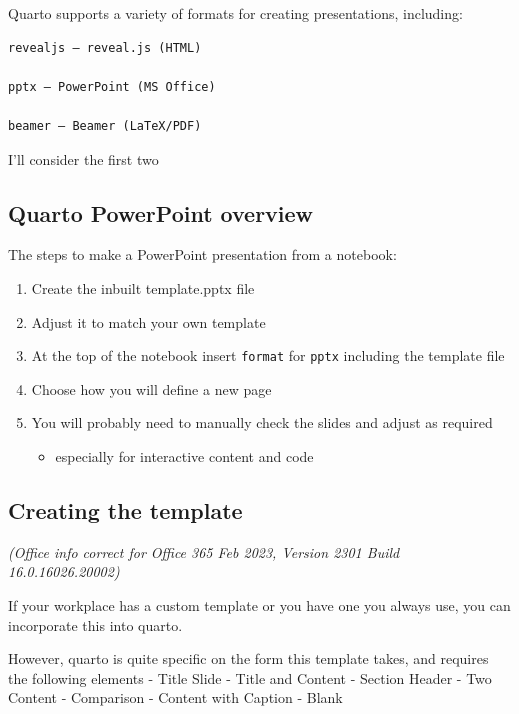 \documentclass[
  letterpaper,
  DIV=11,
  numbers=noendperiod]{scrartcl}
\providecommand{\tightlist}{%
  \setlength{\itemsep}{0pt}\setlength{\parskip}{0pt}}\usepackage{longtable,booktabs,array}
\begin{document}
Quarto supports a variety of formats for creating presentations,
including:

\begin{verbatim}
revealjs — reveal.js (HTML)

pptx — PowerPoint (MS Office)

beamer — Beamer (LaTeX/PDF)
\end{verbatim}

I'll consider the first two

\hypertarget{quarto-powerpoint-overview}{%
\subsection{Quarto PowerPoint
overview}\label{quarto-powerpoint-overview}}

The steps to make a PowerPoint presentation from a notebook:

\begin{enumerate}
\def\labelenumi{\arabic{enumi}.}
\tightlist
\item
  Create the inbuilt template.pptx file
\item
  Adjust it to match your own template
\item
  At the top of the notebook insert \texttt{format} for \texttt{pptx}
  including the template file
\item
  Choose how you will define a new page
\item
  You will probably need to manually check the slides and adjust as
  required

  \begin{itemize}
  \tightlist
  \item
    especially for interactive content and code
  \end{itemize}
\end{enumerate}

\hypertarget{creating-the-template}{%
\subsection{Creating the template}\label{creating-the-template}}

\emph{(Office info correct for Office 365 Feb 2023, Version 2301 Build
16.0.16026.20002)}

If your workplace has a custom template or you have one you always use,
you can incorporate this into quarto.

However, quarto is quite specific on the form this template takes, and
requires the following elements - Title Slide - Title and Content -
Section Header - Two Content - Comparison - Content with Caption - Blank
\end{document}
